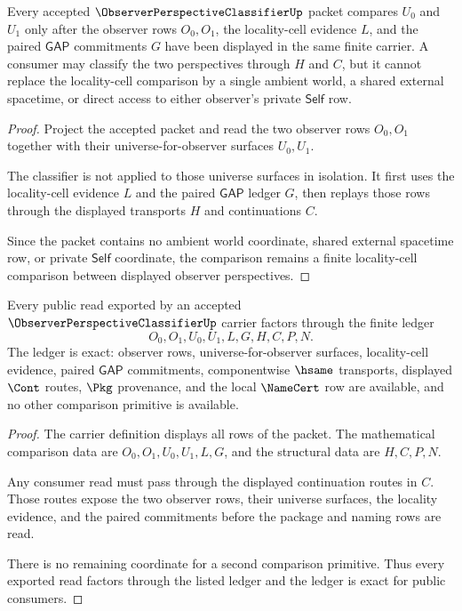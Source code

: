 \begin{theorem}
\label{thm:observer-perspective-classifier-locality-cell-comparison}
Every accepted $\ObserverPerspectiveClassifierUp$ packet compares $U_0$ and $U_1$ only after the observer rows $O_0,O_1$, the locality-cell evidence $L$, and the paired $\mathsf{GAP}$ commitments $G$ have been displayed in the same finite carrier. A consumer may classify the two perspectives through $H$ and $C$, but it cannot replace the locality-cell comparison by a single ambient world, a shared external spacetime, or direct access to either observer's private $\mathsf{Self}$ row.
\end{theorem}
\begin{proof}
Project the accepted packet and read the two observer rows $O_0,O_1$ together with their universe-for-observer surfaces $U_0,U_1$.

The classifier is not applied to those universe surfaces in isolation. It first uses the locality-cell evidence $L$ and the paired $\mathsf{GAP}$ ledger $G$, then replays those rows through the displayed transports $H$ and continuations $C$.

Since the packet contains no ambient world coordinate, shared external spacetime row, or private $\mathsf{Self}$ coordinate, the comparison remains a finite locality-cell comparison between displayed observer perspectives.
\end{proof}

\begin{theorem}
\label{thm:observer-perspective-classifier-ledger-exactness}
Every public read exported by an accepted $\ObserverPerspectiveClassifierUp$ carrier factors through the finite ledger
$$
O_0,O_1,U_0,U_1,L,G,H,C,P,N.
$$
The ledger is exact: observer rows, universe-for-observer surfaces, locality-cell evidence, paired $\mathsf{GAP}$ commitments, componentwise $\hsame$ transports, displayed $\Cont$ routes, $\Pkg$ provenance, and the local $\NameCert$ row are available, and no other comparison primitive is available.
\end{theorem}
\begin{proof}
The carrier definition displays all rows of the packet. The mathematical comparison data are $O_0,O_1,U_0,U_1,L,G$, and the structural data are $H,C,P,N$.

Any consumer read must pass through the displayed continuation routes in $C$. Those routes expose the two observer rows, their universe surfaces, the locality evidence, and the paired commitments before the package and naming rows are read.

There is no remaining coordinate for a second comparison primitive. Thus every exported read factors through the listed ledger and the ledger is exact for public consumers.
\end{proof}

